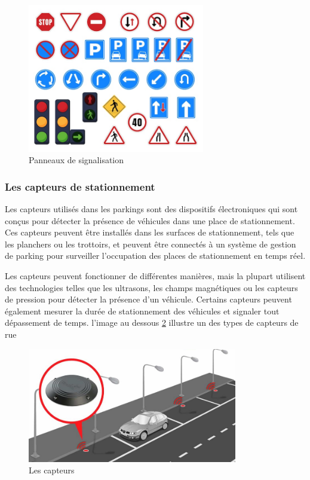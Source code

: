 \begin{figure}[H]
	\centering
	\includegraphics[height=06.5cm]{img/ch1-plak-01.jpg}
	\caption{Panneaux de signalisation}
 \label{ch1plak}
\end{figure}


\subsubsection{Les capteurs de stationnement}
Les capteurs utilisés dans les parkings sont des dispositifs électroniques qui sont conçus pour détecter la présence de véhicules dans une place de stationnement. Ces capteurs peuvent être installés dans les surfaces de stationnement, tels que les planchers ou les trottoirs, et peuvent être connectés à un système de gestion de parking pour surveiller l'occupation des places de stationnement en temps réel.

Les capteurs peuvent fonctionner de différentes manières, mais la plupart utilisent des technologies telles que les ultrasons, les champs magnétiques ou les capteurs de pression pour détecter la présence d'un véhicule. Certains capteurs peuvent également mesurer la durée de stationnement des véhicules et signaler tout dépassement de temps. l'image au dessous \ref{ch1sensor} illustre un des types de capteurs de rue 

\begin{figure}[H]
	\centering
	\includegraphics[height=05cm]{img/ch1-sensor-01.jpg}
	\caption{Les capteurs}
 \label{ch1sensor}
\end{figure}

